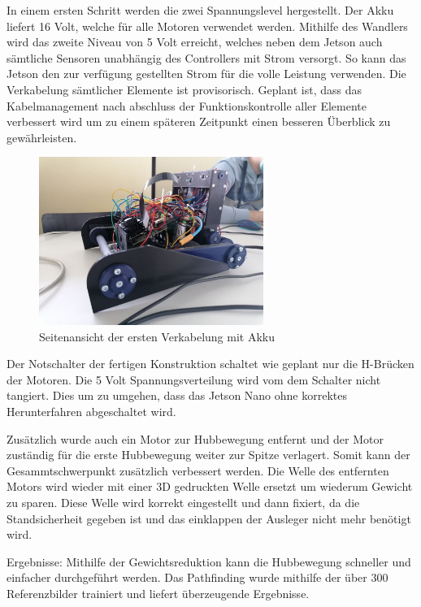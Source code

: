   
  In einem ersten Schritt werden die zwei Spannungslevel hergestellt. Der Akku liefert 16 Volt, welche für alle Motoren verwendet werden. Mithilfe des Wandlers wird das zweite Niveau von 5 Volt erreicht, welches neben dem Jetson auch sämtliche Sensoren unabhängig des Controllers mit Strom versorgt. So kann das Jetson den zur verfügung gestellten Strom für die volle Leistung verwenden.
  Die Verkabelung sämtlicher Elemente ist provisorisch. Geplant ist, dass das Kabelmanagement nach abschluss der Funktionskontrolle aller Elemente verbessert wird um zu einem späteren Zeitpunkt einen besseren Überblick zu gewährleisten.
  
   \begin{figure}[H]
  \includegraphics[width=0.65\textwidth]{img/Sprint3/Sprint3_Verkabelung2.jpg}
  \centering
  \caption{Seitenansicht der ersten Verkabelung mit Akku}
  \label{fig:Seitenansicht der ersten Verkabelung}
  \end{figure}
  
  Der Notschalter der fertigen Konstruktion schaltet wie geplant nur die H-Brücken der Motoren. Die 5 Volt Spannungsverteilung wird vom dem Schalter nicht tangiert. Dies um zu umgehen, dass das Jetson Nano ohne korrektes Herunterfahren abgeschaltet wird.
  
  Zusätzlich wurde auch ein Motor zur Hubbewegung entfernt und der Motor zuständig für die erste Hubbewegung weiter zur Spitze verlagert. Somit kann der Gesammtschwerpunkt zusätzlich verbessert werden.
Die Welle des entfernten Motors wird wieder mit einer 3D gedruckten Welle ersetzt um wiederum Gewicht zu sparen. Diese Welle wird korrekt eingestellt und dann fixiert, da die Standsicherheit gegeben ist und das einklappen der Ausleger nicht mehr benötigt wird.
  
 Ergebnisse: Mithilfe der Gewichtsreduktion kann die Hubbewegung schneller und einfacher durchgeführt werden. Das Pathfinding wurde mithilfe der über 300 Referenzbilder trainiert und liefert überzeugende Ergebnisse.
 
